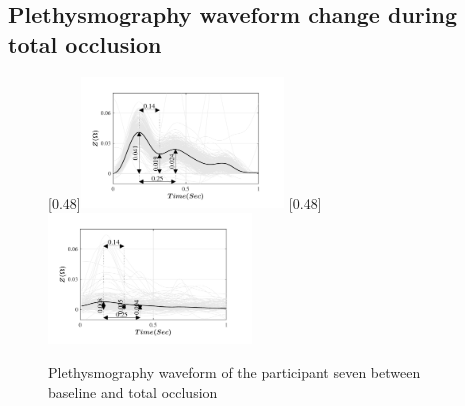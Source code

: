 \subsection{Plethysmography waveform change during total occlusion}
\label{section apa 2.3}
\begin{figure}
	\centering
	\null\hfill%
	[0.48\textwidth]{\includegraphics[width=0.48\textwidth, trim={0.5cm 0cm 1.5cm 0 cm}, clip]{figure_apa_6a}}%
	\hfill%
	[0.48\textwidth]{\includegraphics[width=0.48\textwidth, trim={0.5cm 0cm 1.5cm 0 cm}, clip]{figure_apa_6b}}%
	\hfill\null%
	\caption{Plethysmography waveform of the participant seven between baseline and total occlusion}
	\label{fig:iPG_total}
	
	\vspace{1cm}
	

\end{figure}
